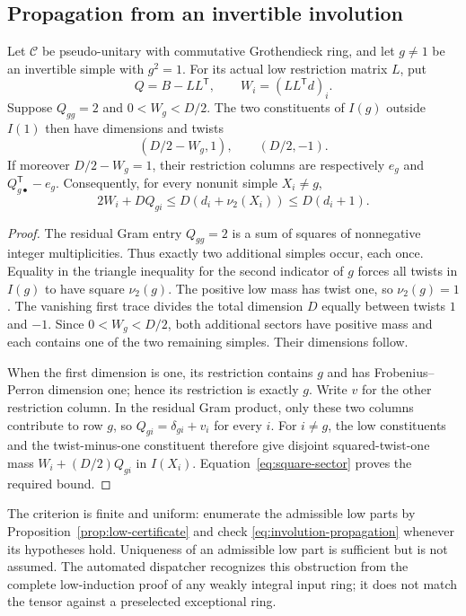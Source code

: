 \subsection{Propagation from an invertible involution}
\begin{proposition}\label{prop:involution-propagation}
Let $\mathcal C$ be pseudo-unitary with commutative Grothendieck ring,
and let $g\ne1$ be an invertible
simple with $g^2=1$. For its actual low restriction matrix $L$, put
\[
 Q=B-LL^{\mathsf T},\qquad W_i=(LL^{\mathsf T}d)_i.
\]
Suppose $Q_{gg}=2$ and $0<W_g<D/2$. The two constituents of $I(g)$
outside $I(1)$ then have dimensions and twists
\[
 (D/2-W_g,1),\qquad(D/2,-1).
\]
If moreover $D/2-W_g=1$, their restriction columns are respectively
$e_g$ and $Q_{g\bullet}^{\mathsf T}-e_g$. Consequently, for every
nonunit simple $X_i\ne g$,
\begin{equation}\label{eq:involution-propagation}
 2W_i+DQ_{gi}\leq D(d_i+\nu_2(X_i))\leq D(d_i+1).
\end{equation}
\end{proposition}
\begin{proof}
The residual Gram entry $Q_{gg}=2$ is a sum of squares of nonnegative
integer multiplicities. Thus exactly two additional simples occur,
each once. Equality in the triangle inequality for the second indicator
of $g$ forces all twists in $I(g)$ to have square $\nu_2(g)$.
The positive low mass has twist one, so $\nu_2(g)=1$.
The vanishing first trace divides the total dimension $D$ equally
between twists $1$ and $-1$. Since $0<W_g<D/2$, both additional
sectors have positive mass and each contains one of the two remaining
simples. Their dimensions follow.

When the first dimension is one, its restriction contains $g$ and has
Frobenius--Perron dimension one; hence its restriction is exactly $g$.
Write $v$ for the other restriction column. In the residual Gram product,
only these two columns contribute to row $g$, so
$Q_{gi}=\delta_{gi}+v_i$ for every $i$.
For $i\ne g$, the low constituents and the twist-minus-one constituent
therefore give disjoint squared-twist-one mass
$W_i+(D/2)Q_{gi}$ in $I(X_i)$. Equation~\eqref{eq:square-sector}
proves the required bound.
\end{proof}
The criterion is finite and uniform: enumerate the admissible low parts
by Proposition~\ref{prop:low-certificate} and check
\eqref{eq:involution-propagation} whenever its hypotheses hold.
Uniqueness of an admissible low part is sufficient but is not assumed.
The automated dispatcher recognizes this obstruction from the complete
low-induction proof of any weakly integral input ring; it does not match
the tensor against a preselected exceptional ring.

